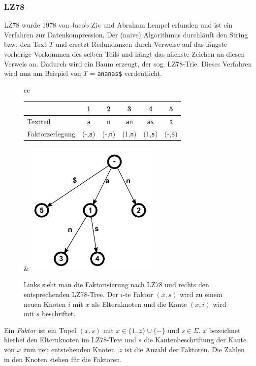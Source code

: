 \documentclass[a4paper,11pt]{scrartcl}%
\theoremstyle{change}
\theoremstyle{nonumberplain}
\theoremstyle{change}
\theoremstyle{nonumberplain}
\theoremstyle{change}
\theoremstyle{nonumberplain}
\begin{document}
	\subsubsection{LZ78}
	LZ78 wurde 1978 von Jacob Ziv und Abraham Lempel erfunden und ist ein Verfahren zur Datenkompression. Der (naive) Algorithmus durchläuft den String bzw. den Text $T$ und ersetzt Redundanzen durch Verweise auf das längste vorherige Vorkommen des selben Teils und hängt das nächste Zeichen an diesen Verweis an. Dadurch wird ein Baum erzeugt, der sog. LZ78-Trie. Dieses Verfahren wird nun am Beispiel von $T$ = \texttt{ananas\$} verdeutlicht.
	\begin{figure}[h]
	\begin{tabular}[t]{cc}
		\begin{tabular}[b]{l c c c c c}\hline
			& 1 & 2 & 3 & 4 & 5 \\ \hline
		   Textteil & \texttt{a} & \texttt{n} & \texttt{an} & \texttt{as} & \texttt{\$}\\ \hline
		   Faktorzerlegung & (-,\texttt{a}) & (-,\texttt{n}) & (1,\texttt{n}) & (1,\texttt{s}) &  (-,\texttt{\$})\\ \hline
		\end{tabular} & \includegraphics{./pics/ananas_LZ78Tree}
	\end{tabular}
	\caption{Links sieht man die Faktorisierung nach LZ78 und rechts den entsprechenden LZ78-Tree. Der $i$-te Faktor $(x,s)$ wird zu einem neuen Knoten $i$ mit $x$ als Elternknoten und die Kante $(x,i)$ wird mit $s$ beschriftet.}
	\label{fig:lz78}
	\end{figure}
	
	Ein \textit{Faktor} ist ein Tupel $(x,s)$ mit $x \in \{1..z\} \cup \{-\}$ und $s \in \Sigma$. $x$ bezeichnet hierbei den Elternknoten im LZ78-Tree und $s$ die Kantenbeschriftung der Kante von $x$ zum neu entstehenden Knoten. $z$ ist die Anzahl der Faktoren. Die Zahlen in den Knoten stehen für die Faktoren. 
	
\end{document}
